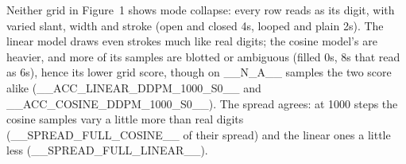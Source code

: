 Neither grid in Figure~1 shows mode collapse: every row reads as its digit, with varied slant,
width and stroke (open and closed 4s, looped and plain 2s). The linear model draws even strokes
much like real digits; the cosine model's are heavier, and more of its samples are blotted or
ambiguous (filled 0s, 8s that read as 6s), hence its lower grid score, though on __N_A__ samples
the two score alike (__ACC_LINEAR_DDPM_1000_S0__ and __ACC_COSINE_DDPM_1000_S0__). The spread agrees: at 1000
steps the cosine samples vary a little more than real digits (__SPREAD_FULL_COSINE__ of their
spread) and the linear ones a little less (__SPREAD_FULL_LINEAR__).
